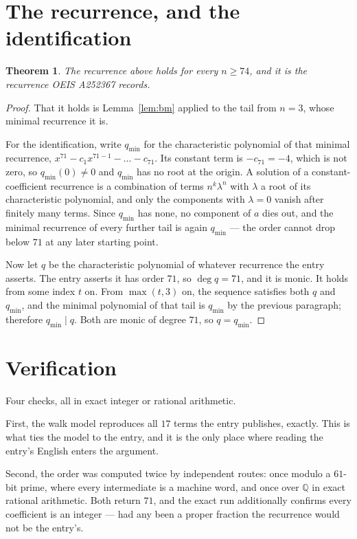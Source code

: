 \documentclass[11pt,a4paper]{article}
\theoremstyle{plain}
\newtheorem{theorem}{Theorem}
\theoremstyle{definition}
\begin{document}
\section{The recurrence, and the identification}

\begin{theorem}
The recurrence above holds for every $n\ge74$, and it is the recurrence OEIS A252367 records.
\end{theorem}

\begin{proof}
That it holds is Lemma~\ref{lem:bm} applied to the tail from $n=3$, whose minimal
recurrence it is.

For the identification, write $q_{\min}$ for the characteristic polynomial of that minimal
recurrence, $x^{71}-c_1x^{71-1}-\dots-c_{71}$. Its constant term is
$-c_{71}=-4$, which is not zero, so $q_{\min}(0)\neq0$ and $q_{\min}$ has no
root at the origin. A solution of a constant-coefficient recurrence is a combination of terms
$n^{k}\lambda^{n}$ with $\lambda$ a root of its characteristic polynomial, and only the
components with $\lambda=0$ vanish after finitely many terms. Since $q_{\min}$ has none, no
component of $a$ dies out, and the minimal recurrence of every further tail is again
$q_{\min}$ --- the order cannot drop below $71$ at any later starting point.

Now let $q$ be the characteristic polynomial of whatever recurrence the entry asserts. The
entry asserts it has order $71$, so $\deg q=71$, and it is monic. It holds from some
index $t$ on. From $\max(t,3)$ on, the sequence satisfies both $q$ and $q_{\min}$, and
the minimal polynomial of that tail is $q_{\min}$ by the previous paragraph; therefore
$q_{\min}\mid q$. Both are monic of degree $71$, so $q=q_{\min}$.
\end{proof}

\section{Verification}

Four checks, all in exact integer or rational arithmetic.

First, the walk model reproduces all $17$ terms the entry publishes, exactly. This is
what ties the model to the entry, and it is the only place where reading the entry's English
enters the argument.

Second, the order was computed twice by independent routes: once modulo a $61$-bit prime, where
every intermediate is a machine word, and once over $\mathbb{Q}$ in exact rational arithmetic.
Both return $71$, and the exact run additionally confirms every coefficient is an integer
--- had any been a proper fraction the recurrence would not be the entry's.
\end{document}
